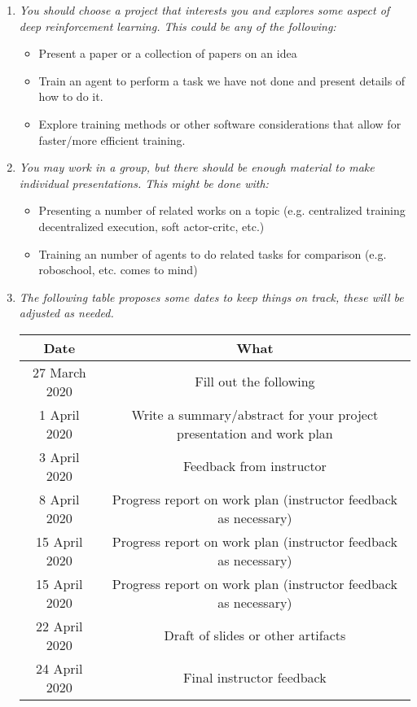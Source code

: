 \documentclass{article}
\begin{document}
\begin{enumerate}
\item {\em  You should choose a project that interests you and explores some aspect of deep reinforcement learning.
    This could be any of the following:}
  \begin{itemize}
  \item Present a paper or a collection of papers on an idea
  \item Train an agent to perform a task we have not done and present details of how to do it.
  \item Explore training methods or other software considerations that allow for faster/more efficient training.
  \end{itemize}

\item {\em You may work in a group, but there should be enough material to make individual presentations. This might be done with:}
  \begin{itemize}
  \item Presenting a number of related works on a topic (e.g. centralized training decentralized execution, soft actor-critc, etc.)
  \item Training an number of agents to do related tasks for comparison (e.g. roboschool, etc. comes to mind)
  \end{itemize}
  
\item {\em The following table proposes some dates to keep things on track, these will be adjusted as needed.}

\begin{centering}
  \begin{tabular}{c|c}
    Date & What \\
    \hline
    27 March 2020 & Fill out the following \href{form}{} \\
    \hline
    1 April 2020 & Write a summary/abstract for your project presentation and work plan \\
    \hline
    3 April 2020 & Feedback from instructor \\
    \hline
    8 April 2020 & Progress report on work plan (instructor feedback as necessary) \\
    \hline
    15 April 2020 & Progress report on work plan (instructor feedback as necessary) \\
    \hline
    15 April 2020 & Progress report on work plan (instructor feedback as necessary) \\
    \hline
    22 April 2020 & Draft of slides or other artifacts \\
    \hline
    24 April 2020 & Final instructor feedback
  \end{tabular}
\end{centering}
\end{enumerate}
\end{document}
